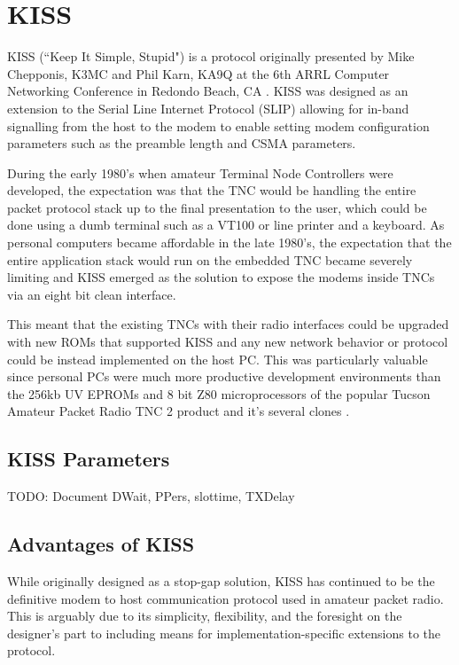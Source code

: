 \chapter{KISS}

KISS (``Keep It Simple, Stupid") is a protocol originally presented by 
Mike Chepponis, K3MC and Phil Karn, KA9Q at the 6th ARRL Computer Networking
Conference in Redondo Beach, CA \cite{KISSspec}.
KISS was designed as an extension to the Serial Line 
Internet Protocol (SLIP) allowing for in-band signalling from 
the host to the modem to enable setting modem 
configuration parameters such as the preamble length and CSMA parameters.

During the early 1980's when amateur Terminal Node Controllers were developed,
the expectation was that the TNC would be handling 
the entire packet protocol stack up to the final presentation to the user, which
could be done using a dumb terminal such as a VT100 or line printer 
and a keyboard. 
As personal computers became affordable in the late 1980's, the expectation that
the entire application stack would run on the embedded TNC became severely limiting
and KISS emerged as the solution to expose the modems inside TNCs via 
an eight bit clean interface.

This meant that the existing TNCs with their radio interfaces could
be upgraded with new ROMs that supported KISS and any new network behavior
or protocol could be instead implemented on the host PC.
This was particularly valuable since personal PCs were much
more productive development environments than the 256kb UV EPROMs and 8 bit
Z80 microprocessors of the popular Tucson Amateur Packet Radio TNC 2 product
and it's several clones \cite{TNC2manual}.

\section{KISS Parameters}
\label{sec:kissparm}

TODO: Document DWait, PPers, slottime, TXDelay

\section{Advantages of KISS}

While originally designed as a stop-gap solution, KISS has continued to be 
the definitive modem to host communication protocol used in amateur packet radio.
This is arguably due to its simplicity, flexibility,
and the foresight on the designer's part
to including means for implementation-specific extensions to the protocol.

